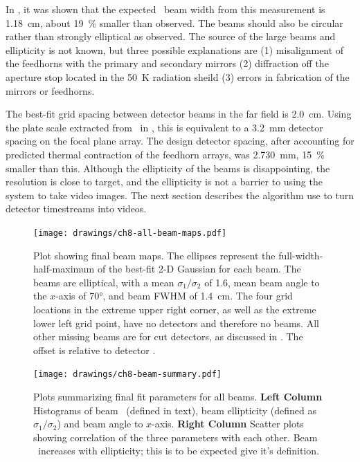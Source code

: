 In , it was shown that the expected \FWHM\ beam width from this measurement is \SI{1.18}{\cm}, about \SI{19}{\percent} smaller than observed.
The beams should also be circular rather than strongly elliptical as observed.
The source of the large beams and ellipticity is not known, but three possible explanations are (1) misalignment of the feedhorns with the primary and secondary mirrors (2) diffraction off the aperture stop located in the \SI{50}{\kelvin} radiation sheild (3) errors in fabrication of the mirrors or feedhorns.

The best-fit grid spacing between detector beams in the far field is \SI{2.0}{\cm}.
Using the plate scale extracted from \ZEMAX\ in , this is equivalent to a \SI{3.2}{\mm} detector spacing on the focal plane array.
The design detector spacing, after accounting for predicted thermal contraction of the feedhorn arrays, was \SI{2.730}{\mm}, \SI{15}{\percent} smaller than this.
Although the ellipticity of the beams is disappointing, the resolution is close to target, and the ellipticity is not a barrier to using the system to take video images. The next section describes the algorithm use to turn detector timestreams into videos.

\begin{figure}[th]
\centering
\texttt{[image: drawings/ch8-all-beam-maps.pdf]}
\caption{
Plot showing final beam maps.
The ellipses represent the full-width-half-maximum of the best-fit 2-D Gaussian for each beam. The beams are elliptical, with a mean $\sigma_1/\sigma_2$ of 1.6, mean beam angle to the $x$-axis of \ang{70}, and beam FWHM of \SI{1.4}{\cm}.
The four grid locations in the extreme upper right corner, as well as the extreme lower left grid point, have no detectors and therefore no beams. All other missing beams are for cut detectors, as discussed in .
The offset is relative to detector .
}
\label{fig:ch8-all-beam-maps}
\end{figure}

\begin{figure}[th]
\centering
\texttt{[image: drawings/ch8-beam-summary.pdf]}
\caption{
  Plots summarizing final fit parameters for all beams.
  \textbf{Left Column} Histograms of beam \FWHM\ (defined in text), beam ellipticity (defined as $\sigma_1 / \sigma_2$) and beam angle to $x$-axis.
  \textbf{Right Column} Scatter plots showing correlation of the three parameters with each other. Beam \FWHM\ increases with ellipticity; this is to be expected give it's definition.
}
\label{fig:ch8-beam-summary}
\end{figure}

